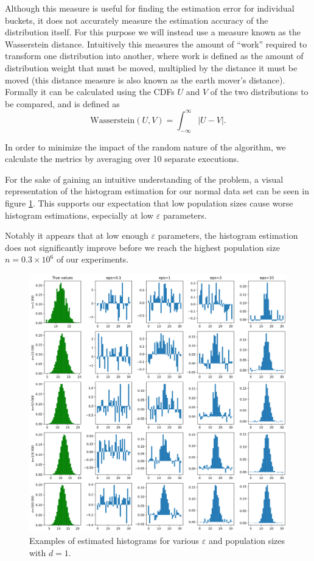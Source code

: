 \documentclass[12pt]{article}
\renewcommand{\epsilon}{\varepsilon}
\begin{document}
Although this measure is useful for finding the estimation error for individual buckets, it does not accurately measure the estimation accuracy of the distribution itself. For this purpose we will instead use a measure known as the Wasserstein distance. Intuitively this measures the amount of ``work'' required to transform one distribution into another, where work is defined as the amount of distribution weight that must be moved, multiplied by the distance it must be moved (this distance measure is also known as the earth mover's distance). Formally it can be calculated using the CDFs $U$ and $V$ of the two distributions to be compared, and is defined as
\begin{equation*}
    \text{Wasserstein}(U,V) = \int_{-\infty}^\infty |U-V|.
\end{equation*}

In order to minimize the impact of the random nature of the algorithm, we calculate the metrics by averaging over 10 separate executions. \bigskip

For the sake of gaining an intuitive understanding of the problem, a visual representation of the histogram estimation for our normal data set can be seen in figure \ref{fig:histogram_matrix}. This supports our expectation that low population sizes cause worse histogram estimations, especially at low $\epsilon$ parameters.

Notably it appears that at low enough $\epsilon$ parameters, the histogram estimation does not significantly improve before we reach the highest population size $n=0.3 \times 10^6$ of our experiments.

\begin{figure}
    \centering
    \includegraphics[width=\textwidth]{imgs/histogram_matrix.png}
    \caption{Examples of estimated histograms for various $\epsilon$ and population sizes with $d=1$.}
    \label{fig:histogram_matrix}
\end{figure}
\end{document}

